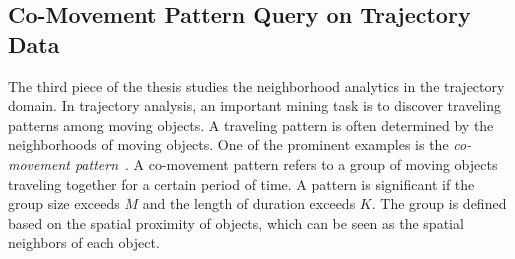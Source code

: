 \subsection{Co-Movement Pattern Query on Trajectory Data}
The third piece of the thesis studies the neighborhood
analytics in the trajectory domain. 
In trajectory analysis, an important
mining task is to discover traveling patterns among moving objects. 
A traveling pattern is often determined by the neighborhoods of moving objects. One of the prominent examples is the \emph{co-movement pattern}~\cite{li2013managing,zheng2015trajectory}.
A co-movement pattern refers to a group of moving objects traveling together for a certain period of time. A pattern is significant if the group size exceeds $M$ and the length of duration exceeds $K$. 
The group is defined based on the spatial proximity of objects, which 
can be seen as the spatial neighbors of each object.


